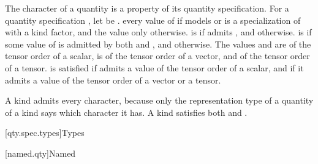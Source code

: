 \pnum
The character of a quantity is a property of its quantity specification.
For a quantity specification ,
let  be .
  every value of 
if  models 
or is a specialization of  with a kind factor,
and the value  only otherwise.
 is  if  admits ,
and  otherwise.
 is  if
some value of  is admitted by both  and ,
and  otherwise.
The values  and  are of the tensor order of a scalar,
 is of the tensor order of a vector, and  of the tensor order of a tensor.
 is satisfied if  admits a value of the tensor order of a scalar,
and  if it admits a value of the tensor order of a vector or a tensor.
\begin{note}
A kind admits every character,
because only the representation type of a quantity of a kind says which character it has.
A kind satisfies both  and .
\end{note}

[qty.spec.types]{Types}

[named.qty]{Named}

